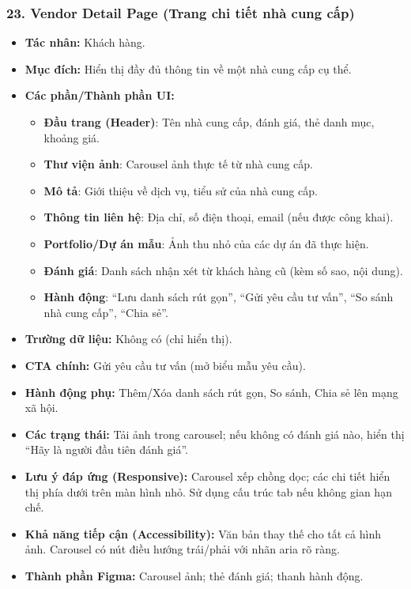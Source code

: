 \documentclass[11pt,a4paper]{article}
\begin{document}
\subsubsection{23. Vendor Detail Page (Trang chi tiết nhà cung cấp)}
\begin{itemize}
    \item \textbf{Tác nhân:} Khách hàng.
    \item \textbf{Mục đích:} Hiển thị đầy đủ thông tin về một nhà cung cấp cụ thể.
    \item \textbf{Các phần/Thành phần UI:}
    \begin{itemize}
        \item \textbf{Đầu trang (Header)}: Tên nhà cung cấp, đánh giá, thẻ danh mục, khoảng giá.
        \item \textbf{Thư viện ảnh}: Carousel ảnh thực tế từ nhà cung cấp.
        \item \textbf{Mô tả}: Giới thiệu về dịch vụ, tiểu sử của nhà cung cấp.
        \item \textbf{Thông tin liên hệ}: Địa chỉ, số điện thoại, email (nếu được công khai).
        \item \textbf{Portfolio/Dự án mẫu}: Ảnh thu nhỏ của các dự án đã thực hiện.
        \item \textbf{Đánh giá}: Danh sách nhận xét từ khách hàng cũ (kèm số sao, nội dung).
        \item \textbf{Hành động}: ``Lưu danh sách rút gọn'', ``Gửi yêu cầu tư vấn'', ``So sánh nhà cung cấp'', ``Chia sẻ''.
    \end{itemize}
    \item \textbf{Trường dữ liệu:} Không có (chỉ hiển thị).
    \item \textbf{CTA chính:} Gửi yêu cầu tư vấn (mở biểu mẫu yêu cầu).
    \item \textbf{Hành động phụ:} Thêm/Xóa danh sách rút gọn, So sánh, Chia sẻ lên mạng xã hội.
    \item \textbf{Các trạng thái:} Tải ảnh trong carousel; nếu không có đánh giá nào, hiển thị ``Hãy là người đầu tiên đánh giá''.
    \item \textbf{Lưu ý đáp ứng (Responsive):} Carousel xếp chồng dọc; các chi tiết hiển thị phía dưới trên màn hình nhỏ. Sử dụng cấu trúc tab nếu không gian hạn chế.
    \item \textbf{Khả năng tiếp cận (Accessibility):} Văn bản thay thế cho tất cả hình ảnh. Carousel có nút điều hướng trái/phải với nhãn aria rõ ràng.
    \item \textbf{Thành phần Figma:} Carousel ảnh; thẻ đánh giá; thanh hành động.
\end{itemize}
\end{document}
